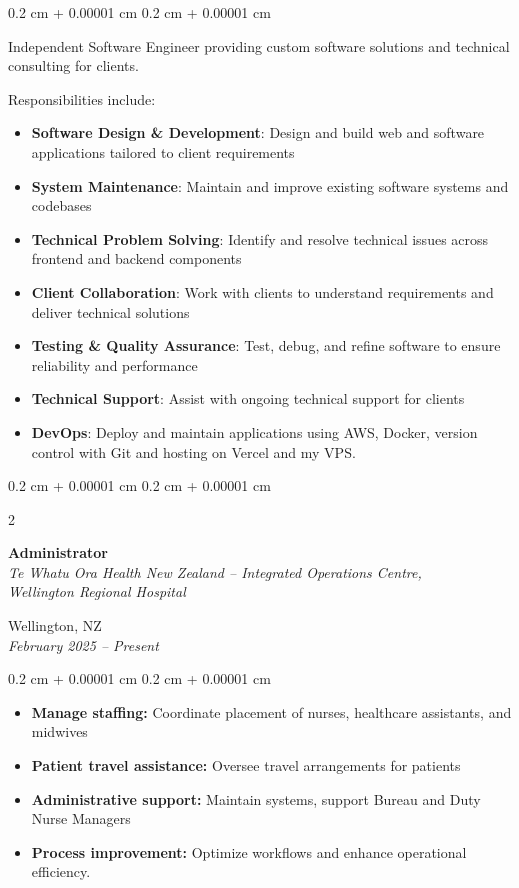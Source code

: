 \documentclass[10pt, letterpaper]{article}
\newenvironment{highlights}{
    \begin{itemize}[
        topsep=0.10 cm,
        parsep=0.10 cm,
        partopsep=0pt,
        itemsep=0pt,
        leftmargin=0.4 cm + 10pt
    ]
}{
    \end{itemize}
} %
\newenvironment{onecolentry}{
    \begin{adjustwidth}{
        0.2 cm + 0.00001 cm
    }{
        0.2 cm + 0.00001 cm
    }
}{
    \end{adjustwidth}
} %
\newenvironment{twocolentry}[2][]{
    \onecolentry
    \def\secondColumn{#2}
    \setcolumnwidth{\fill, 4.5 cm}
    \begin{paracol}{2}
}{
    \switchcolumn \raggedleft \secondColumn
    \end{paracol}
    \endonecolentry
} %
\begin{document}
            \vspace{0.10 cm}
            \begin{onecolentry}
    Independent Software Engineer providing custom software solutions and technical consulting for clients.
    
    \vspace{0.2 cm}
    
    Responsibilities include:
    
    \begin{highlights}
        \item \textbf{Software Design \& Development}: Design and build web and software applications tailored to client requirements
        \item \textbf{System Maintenance}: Maintain and improve existing software systems and codebases
        \item \textbf{Technical Problem Solving}: Identify and resolve technical issues across frontend and backend components
        \item \textbf{Client Collaboration}: Work with clients to understand requirements and deliver technical solutions
        \item \textbf{Testing \& Quality Assurance}: Test, debug, and refine software to ensure reliability and performance
        \item \textbf{Technical Support}: Assist with ongoing technical support for clients
        \item \textbf{DevOps}: Deploy and maintain applications using AWS, Docker, version control with Git and hosting on Vercel and my VPS.
    \end{highlights} 
            \end{onecolentry}

        \vspace{0.2 cm}

        \begin{twocolentry}
      {Wellington, NZ \\ \textit{February 2025 – Present}}
      {\textbf{Administrator} \\
       \textit{Te Whatu Ora Health New Zealand – Integrated Operations Centre,\\ Wellington Regional Hospital}}
    \end{twocolentry}
    
    \vspace{0.2 cm}
    
    \begin{onecolentry}
    \begin{highlights}
      \item \textbf{Manage staffing:} Coordinate placement of nurses, healthcare assistants, and midwives
      \item \textbf{Patient travel assistance:} Oversee travel arrangements for patients
      \item \textbf{Administrative support:} Maintain systems, support Bureau and Duty Nurse Managers
      \item \textbf{Process improvement:} Optimize workflows and enhance operational efficiency.
    \end{highlights}
    \end{onecolentry}
\end{document}
